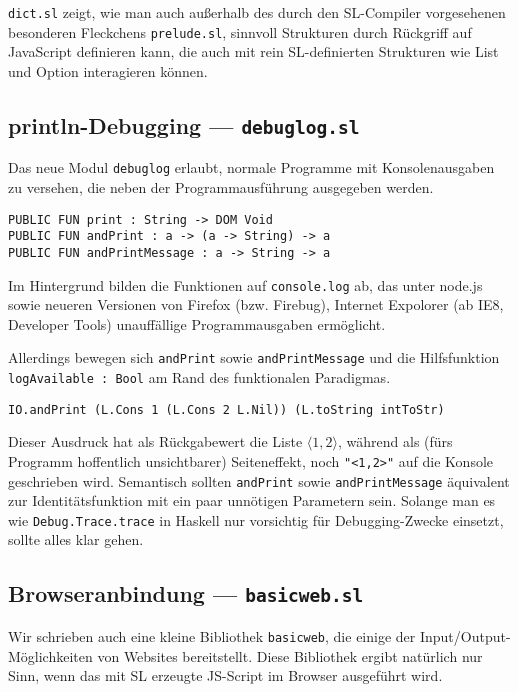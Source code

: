 \documentclass[runningheads]{llncs}
\begin{document}
\verb|dict.sl| zeigt, wie man auch außerhalb des durch den SL-Compiler
vorgesehenen besonderen Fleckchens \verb|prelude.sl|, sinnvoll Strukturen
durch Rückgriff auf JavaScript definieren kann, die auch mit rein
SL-definierten Strukturen wie List und Option interagieren können.

\subsection{println-Debugging --- \texttt{debuglog.sl}}

Das neue Modul \verb|debuglog| erlaubt, normale Programme mit Konsolenausgaben
zu versehen, die neben der Programmausführung ausgegeben werden.

\begin{verbatim}
PUBLIC FUN print : String -> DOM Void
PUBLIC FUN andPrint : a -> (a -> String) -> a
PUBLIC FUN andPrintMessage : a -> String -> a
\end{verbatim}

Im Hintergrund bilden die Funktionen auf \verb|console.log| ab, das unter
node.js sowie neueren Versionen von Firefox (bzw. Firebug), Internet Expolorer
(ab IE8, Developer Tools) unauffällige Programmausgaben ermöglicht.

Allerdings bewegen sich \verb|andPrint| sowie \verb|andPrintMessage| und die
Hilfsfunktion \verb|logAvailable : Bool| am Rand des funktionalen Paradigmas.

\begin{verbatim}
IO.andPrint (L.Cons 1 (L.Cons 2 L.Nil)) (L.toString intToStr)
\end{verbatim}

Dieser Ausdruck hat als Rückgabewert die Liste $\langle1,2\rangle$,
während als (fürs Programm hoffentlich unsichtbarer) Seiteneffekt,
noch \verb|"<1,2>"| auf die Konsole geschrieben wird. Semantisch sollten
\verb|andPrint| sowie \verb|andPrintMessage| äquivalent zur Identitätsfunktion
mit ein paar unnötigen Parametern sein. Solange man es wie
\verb|Debug.Trace.trace| in Haskell nur vorsichtig für Debugging-Zwecke
einsetzt, sollte alles klar gehen.

\subsection{Browseranbindung --- \texttt{basicweb.sl}}

Wir schrieben auch eine kleine Bibliothek \verb|basicweb|, die einige der
Input/Output-Möglichkeiten von Websites bereitstellt. Diese Bibliothek ergibt
natürlich nur Sinn, wenn das mit SL erzeugte JS-Script im Browser ausgeführt
wird.
\end{document}
